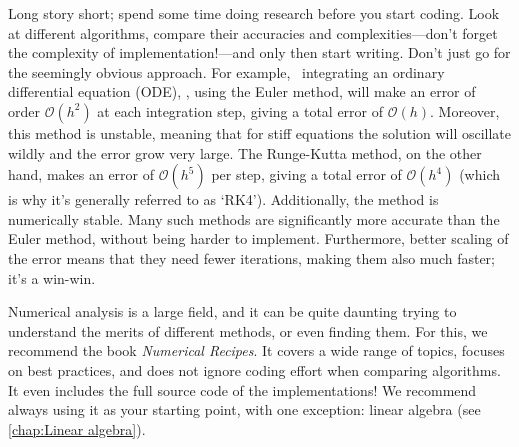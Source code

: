 \documentclass[openany,oneside]{report}
\begin{document}
Long story short; spend some time doing research before you start coding.
Look at different algorithms, compare their accuracies and complexities---don't forget the complexity of implementation!---and only then start writing.
Don't just go for the seemingly obvious approach.
For example, \naively\ integrating an ordinary differential equation (ODE), \eg, using the Euler method, will make an error of order $\mathcal{O}\left(h^2\right)$ at each integration step, giving a total error of $\mathcal{O}(h)$.
Moreover, this method is unstable, meaning that for stiff equations the solution will oscillate wildly and the error grow very large.
The Runge-Kutta method, on the other hand, makes an error of $\mathcal{O}\left(h^5\right)$ per step, giving a total error of $\mathcal{O}\left(h^4\right)$ (which is why it's generally referred to as `RK4').
Additionally, the method is numerically stable.
Many such methods are significantly more accurate than the Euler method, without being harder to implement.
Furthermore, better scaling of the error means that they need fewer iterations, making them also much faster; it's a win-win.

Numerical analysis is a large field, and it can be quite daunting trying to understand the merits of different methods, or even finding them.
For this, we recommend the book \emph{Numerical Recipes}.
It covers a wide range of topics, focuses on best practices, and does not ignore coding effort when comparing algorithms.
It even includes the full source code of the implementations! We recommend always using it as your starting point, with one exception: linear algebra (see \autoref{chap:Linear algebra}).
\end{document}
